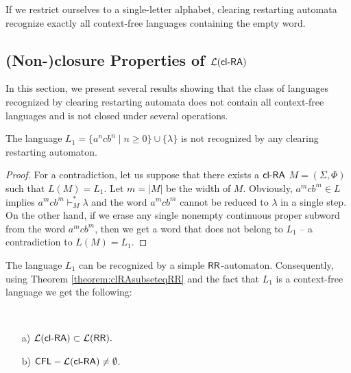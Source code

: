 \begin{corollary}
If we restrict ourselves to a single-letter alphabet, clearing restarting automata recognize exactly all context-free languages containing the empty word.
\end{corollary}

\subsection{(Non-)closure Properties of ${\mathcal L}(\textup{\sf cl-RA\/})$}
\label{se:nonClosureclRA}

In this section, we present several results showing that the class of languages recognized by clearing restarting automata does not contain all context-free languages and is not closed under several operations.

\begin{theorem}\label{theorem:L_1}
The language $L_1 = \{a^ncb^n \mid n \ge 0\} \cup \{\lambda\}$ is not recognized by any clearing restarting automaton.
\end{theorem}

\begin{proof}
For a contradiction, let us suppose that there exists a $\textup{\sf cl-RA\/}$ $M = (\Sigma,\Phi)$ such that $L(M) = L_1$. Let $m = |M|$ be the width of $M$. Obviously, $a^m c b^m \in L$ implies $a^m c b^m \vdash_M^* \lambda$ and the word $a^m c b^m$ cannot be reduced to $\lambda$ in a single step. On the other hand, if we erase any single nonempty continuous proper subword from the word $a^m c b^m$, then  we get a word that does not belong to $L_1$ -- a contradiction to $L(M) = L_1$.
\end{proof}

The language $L_1$ can be recognized by a simple $\textup{\sf RR}$-automaton. Consequently, using Theorem \ref{theorem:clRAsubseteqRR} and the fact that $L_1$ is a context-free language we get the following:

\begin{corollary}\label{corollary:clRasubsetRRWW}\hspace{1 cm} \
\begin{enumerate}
    \item[a)]
        ${\cal L}(\textup{\sf cl-RA\/}) \subset {\cal L}(\textup{\sf RR}).$
    \item[b)] \label{co:clRAnotallCFL}
        $\textup{\sf CFL} - {\cal L}(\textup{\sf cl-RA\/}) \not= \emptyset$.
\end{enumerate}
\end{corollary}

